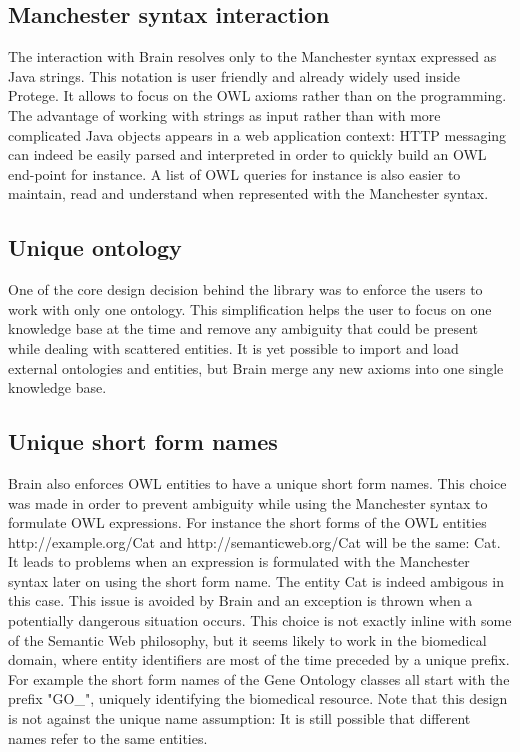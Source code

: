 \documentclass{llncs}
\begin{document}
\subsection{Manchester syntax interaction}
The interaction with Brain resolves only to the Manchester syntax expressed as Java strings.
This notation is user friendly and already widely used inside Protege. It allows to focus on the OWL axioms rather than on the programming.
The advantage of working with strings as input rather than with more complicated Java objects appears in a web application context:
HTTP messaging can indeed be easily parsed and interpreted in order to quickly build an OWL end-point for instance.
A list of OWL queries for instance is also easier to maintain, read and understand when represented with the Manchester syntax.

\subsection{Unique ontology}
One of the core design decision behind the library was to enforce the users to work with only one ontology.
This simplification helps the user to focus on one knowledge base at the time and remove any ambiguity that could be present while
dealing with scattered entities. It is yet possible to import and load external ontologies
and entities, but Brain merge any new axioms into one single knowledge base.

\subsection{Unique short form names}
Brain also enforces OWL entities to have a unique short form names. This choice was made in order to prevent ambiguity while using 
the Manchester syntax to formulate OWL expressions. For instance the short forms of the OWL entities http://example.org/Cat and
http://semanticweb.org/Cat will be the same: Cat. It leads to problems when an expression is formulated with the Manchester syntax later
on using the short form name. The entity Cat is indeed ambigous in this case. This issue is avoided by Brain and an exception is thrown 
when a potentially dangerous situation occurs. This choice is not exactly inline with some of the Semantic Web philosophy, but it
seems likely to work in the biomedical domain, where entity identifiers are most of the time preceded by a unique prefix. For example
the short form names of the Gene Ontology classes all start with the prefix "GO\_", uniquely identifying the biomedical resource.
Note that this design is not against the unique name assumption: It is still possible that different names refer to the same entities.
\end{document}
